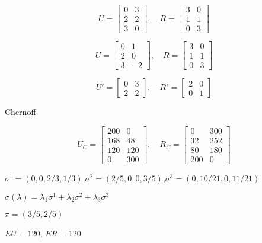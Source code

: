 \documentclass{article}
\begin{document}

\iffalse

\[
U =
\begin{bmatrix}
    0 & 3 \\
    2 & 2 \\
    3 & 0
\end{bmatrix}
, \quad
R =
\begin{bmatrix}
    3 & 0 \\
    1 & 1 \\
    0 & 3
\end{bmatrix}
\]

\[
U =
\begin{bmatrix}
    0 & 1 \\
    2 & 0 \\
    3 & -2
\end{bmatrix}
, \quad
R =
\begin{bmatrix}
    3 & 0 \\
    1 & 1 \\
    0 & 3
\end{bmatrix}
\]

\[
U' =
\begin{bmatrix}
    0 & 3 \\
    2 & 2 
\end{bmatrix}
, \quad
R' =
\begin{bmatrix}
    2 & 0 \\
    0 & 1 
\end{bmatrix}
\]

Chernoff

\[
U_C =
\begin{bmatrix}
    200 & 0 \\
    168 & 48 \\
    120 & 120 \\
    0 & 300
\end{bmatrix}
, \quad
R_C =
\begin{bmatrix}
    0 & 300 \\
    32 & 252 \\
    80 & 180 \\
    200 & 0
\end{bmatrix}
\]

$\sigma^1=(0,0,2/3,1/3)$,$\sigma^2=(2/5,0,0,3/5)$,$\sigma^3=(0,10/21,0,11/21)$

$\sigma(\lambda)=\lambda_1 \sigma^1 + \lambda_2 \sigma^2 + \lambda_3 \sigma^3$

$\pi=(3/5,2/5)$

$EU = 120$, $ER = 120$
\end{document}
